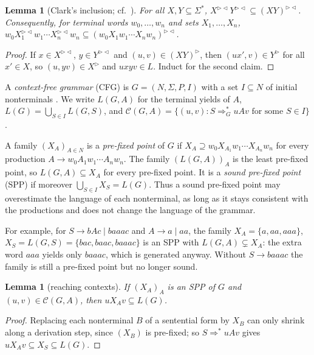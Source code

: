 \documentclass[11pt]{article}
\numberwithin{equation}{section}
\theoremstyle{plain}
\newtheorem{lemma}[theorem]{Lemma}
\theoremstyle{definition}
\theoremstyle{remark}
\theoremstyle{plain}
\newcommand{\R}{^{\rhd}}
\newcommand{\RL}{^{\rhd\lhd}}
\begin{document}
\begin{lemma}[Clark's inclusion; cf.\ \citealp{clark2009fg}]\label{lem:clark}
For all $X,Y\subseteq\Sigma^*$, $X\RL Y\RL\subseteq(XY)\RL$.  Consequently, for
terminal words $w_0,\dots,w_n$ and sets $X_1,\dots,X_n$,
$w_0X_1\RL w_1\cdots X_n\RL w_n\subseteq(w_0X_1w_1\cdots X_nw_n)\RL$.
\end{lemma}
\begin{proof}
If $x\in X\RL$, $y\in Y\RL$ and $(u,v)\in(XY)\R$, then $(ux',v)\in Y\R$ for all
$x'\in X$, so $(u,yv)\in X\R$ and $uxyv\in L$.  Induct for the second claim.
\end{proof}

A \emph{context-free grammar} (CFG) is $G=(N,\Sigma,P,I)$ with a set
$I\subseteq N$ of initial nonterminals \citep{ky2017}.  We write
$L(G,A)$ for the terminal yields of $A$, $L(G)=\bigcup_{S\in I}L(G,S)$, and
$\mathcal C(G,A)=\{(u,v): S\Rightarrow^*_G uAv \text{ for some } S\in I\}$.

A family $(X_A)_{A\in N}$ is a \emph{pre-fixed point} of $G$ if
$X_A\supseteq w_0X_{A_1}w_1\cdots X_{A_n}w_n$ for every production
$A\to w_0A_1w_1\cdots A_nw_n$.  The family $(L(G,A))_A$ is the least
pre-fixed point, so $L(G,A)\subseteq X_A$ for every pre-fixed point.  It is a
\emph{sound pre-fixed point} (SPP) if moreover $\bigcup_{S\in I}X_S=L(G)$.
Thus a sound pre-fixed point may overestimate the language of each
nonterminal, as long as it stays consistent with the productions and does
not change the language of the grammar.

For example, for $S\to bAc\mid baaac$ and $A\to a\mid aa$, the family
$X_A=\{a,aa,aaa\}$, $X_S=L(G,S)=\{bac,baac,baaac\}$ is an SPP with
$L(G,A)\subsetneq X_A$: the extra word $aaa$ yields only $baaac$, which is
generated anyway.  Without $S\to baaac$ the family is still a pre-fixed
point but no longer sound.

\begin{lemma}[reaching contexts]\label{lem:reach}
If $(X_A)_A$ is an SPP of $G$ and $(u,v)\in\mathcal C(G,A)$, then
$uX_Av\subseteq L(G)$.
\end{lemma}
\begin{proof}
Replacing each nonterminal $B$ of a sentential form by $X_B$ can only shrink
along a derivation step, since $(X_B)$ is pre-fixed; so $S\Rightarrow^*uAv$
gives $uX_Av\subseteq X_S\subseteq L(G)$.
\end{proof}
\end{document}

